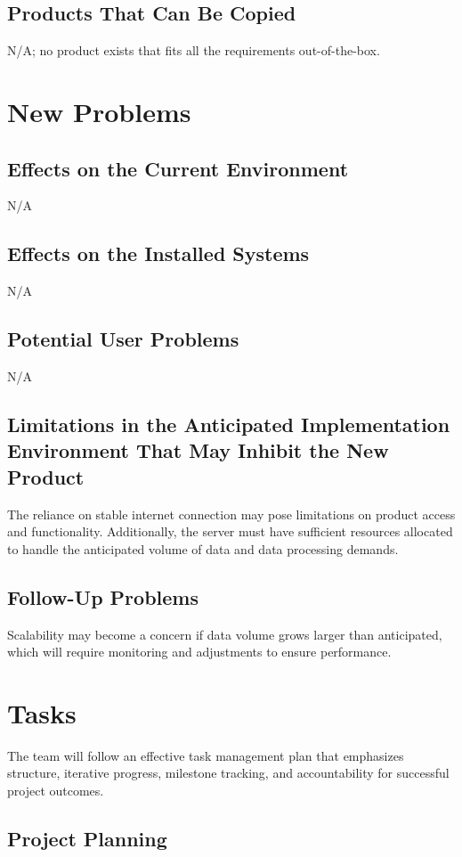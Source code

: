 \documentclass[12pt]{article}
\begin{document}
\subsection{Products That Can Be Copied}
N/A; no product exists that fits all the requirements out-of-the-box.


\section{New Problems}
\subsection{Effects on the Current Environment}
N/A

\subsection{Effects on the Installed Systems}
N/A

\subsection{Potential User Problems}
N/A

\subsection{Limitations in the Anticipated Implementation Environment That May
Inhibit the New Product}
The reliance on stable internet connection may pose limitations on product access and functionality. Additionally, the server must have sufficient resources allocated to handle the anticipated volume of data and data processing demands.

\subsection{Follow-Up Problems}
Scalability may become a concern if data volume grows larger than anticipated, which will require monitoring and adjustments to ensure performance.

\section{Tasks}
The team will follow an effective task management plan that emphasizes
structure, iterative progress, milestone tracking, and accountability for
successful project outcomes. 
\subsection{Project Planning}
\end{document}
